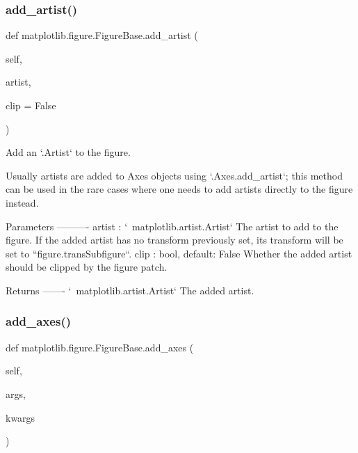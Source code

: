 \subsubsection{\texorpdfstring{add\+\_\+artist()}{add\_artist()}}
{\footnotesize\ttfamily def matplotlib.\+figure.\+Figure\+Base.\+add\+\_\+artist (\begin{DoxyParamCaption}\item[{}]{self,  }\item[{}]{artist,  }\item[{}]{clip = {\ttfamily False} }\end{DoxyParamCaption})}

\begin{DoxyVerb}Add an `.Artist` to the figure.

Usually artists are added to Axes objects using `.Axes.add_artist`;
this method can be used in the rare cases where one needs to add
artists directly to the figure instead.

Parameters
----------
artist : `~matplotlib.artist.Artist`
    The artist to add to the figure. If the added artist has no
    transform previously set, its transform will be set to
    ``figure.transSubfigure``.
clip : bool, default: False
    Whether the added artist should be clipped by the figure patch.

Returns
-------
`~matplotlib.artist.Artist`
    The added artist.
\end{DoxyVerb}
 \mbox{\label{classmatplotlib_1_1figure_1_1FigureBase_a656e99920c3eac791b04ce3d6a536656}} 
\subsubsection{\texorpdfstring{add\+\_\+axes()}{add\_axes()}}
{\footnotesize\ttfamily def matplotlib.\+figure.\+Figure\+Base.\+add\+\_\+axes (\begin{DoxyParamCaption}\item[{}]{self,  }\item[{}]{args,  }\item[{}]{kwargs }\end{DoxyParamCaption})}

